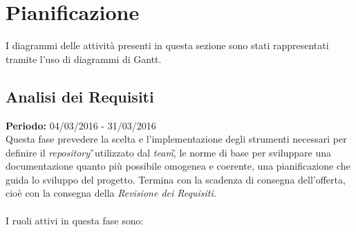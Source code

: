 \section{Pianificazione}
I diagrammi delle attività presenti in questa sezione sono stati rappresentati 
tramite l'uso di diagrammi di Gantt.

\subsection{Analisi dei Requisiti}
\textbf{Periodo:} 04/03/2016 - 31/03/2016\\
Questa fase prevedere la scelta e l'implementazione degli strumenti necessari 
per definire il \textit{repository}\G\ utilizzato dal \textit{team}\G, le 
norme di base per sviluppare una documentazione quanto più possibile omogenea e 
coerente, una pianificazione che guida lo sviluppo del progetto. Termina con 
la scadenza di consegna dell'offerta, cioè con la consegna della 
\textit{Revisione dei Requisiti}.\\\\
I ruoli attivi in questa fase sono:

